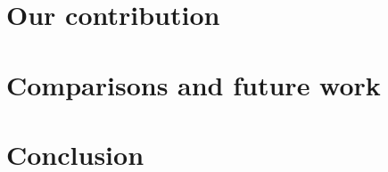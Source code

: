 \documentclass[11pt, leqno]{article}
\theoremstyle{definition}
\begin{document}
\section{Our contribution}





\section{Comparisons and future work}


\section{Conclusion}



\newpage
\end{document}
